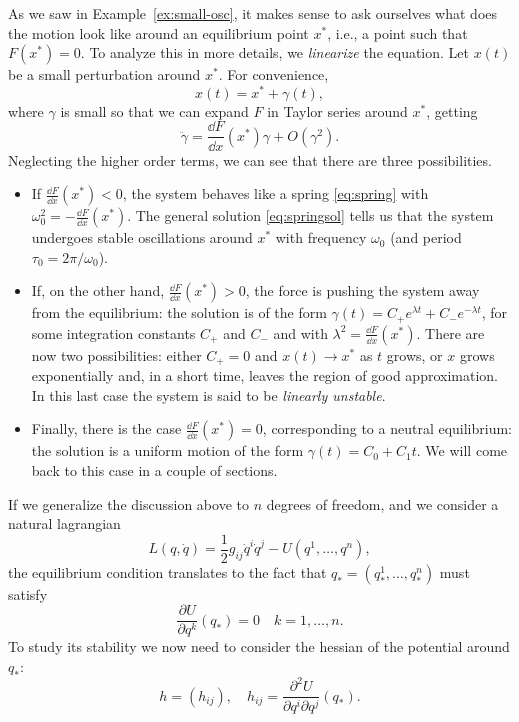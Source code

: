 \documentclass[english,fontsize=11pt,paper=b5]{scrbook}
\numberwithin{equation}{chapter}
\theoremstyle{definition}
\begin{document}
    As we saw in Example~\ref{ex:small-osc}, it makes sense to ask ourselves what does the motion look like around an equilibrium point $x^*$, i.e., a point such that $F(x^*) = 0$.
    To analyze this in more details, we \emph{linearize} the equation.
    Let $x(t)$ be a small perturbation around $x^*$. For convenience,
    \begin{equation}
      x(t) = x^* + \gamma(t),
    \end{equation}
    where $\gamma$ is small so that we can expand $F$ in Taylor series around $x^*$, getting
    \begin{equation}
      \ddot \gamma = \frac{\dd F}{\dd x}(x^*)\gamma + O(\gamma^2).
    \end{equation}
    Neglecting the higher order terms, we can see that there are three possibilities.
    \begin{itemize}
      \item If $\frac{\dd F}{\dd x}(x^*) < 0$, the system behaves like a spring \eqref{eq:spring} with $\omega_0^2 = -\frac{\dd F}{\dd x}(x^*)$. The general solution \eqref{eq:springsol} tells us that the system undergoes stable oscillations around $x^*$ with frequency $\omega_0$ (and period $\tau_0 = 2\pi/\omega_0$).
      \item If, on the other hand, $\frac{\dd F}{\dd x}(x^*) > 0$, the force is pushing the system away from the equilibrium: the solution is of the form $\gamma(t) = C_+ e^{\lambda t} + C_- e^{-\lambda t}$, for some integration constants $C_+$ and $C_-$ and with $\lambda^2 = \frac{\dd F}{\dd x}(x^*)$. There are now two possibilities: either $C_+ = 0$ and $x(t) \to x^*$ as $t$ grows, or $x$ grows exponentially and, in a short time, leaves the region of good approximation. In this last case the system is said to be \emph{linearly unstable}.
      \item Finally, there is the case $\frac{\dd F}{\dd x}(x^*) = 0$, corresponding to a neutral equilibrium: the solution is a uniform motion of the form $\gamma(t) = C_0 + C_1 t$.
        We will come back to this case in a couple of sections.
    \end{itemize}

    If we generalize the discussion above to $n$ degrees of freedom, and we consider a natural lagrangian
    \begin{equation}
      L(q,\dot q) = \frac12 g_{ij} \dot q^i \dot q^j - U(q^1, \ldots, q^n),
    \end{equation}
    the equilibrium condition translates to the fact that $q_* = (q_*^1, \ldots, q_*^n)$ must satisfy
    \begin{equation}
      \frac{\partial U}{\partial q^k} (q_*) = 0 \quad k=1,\ldots,n.
    \end{equation}
    To study its stability we now need to consider the hessian of the potential around $q_*$:
    \begin{equation}
      h = (h_{ij}),\quad h_{ij} = \frac{\partial^2 U}{\partial q^i\partial q^j} (q_*).
    \end{equation}
\end{document}
